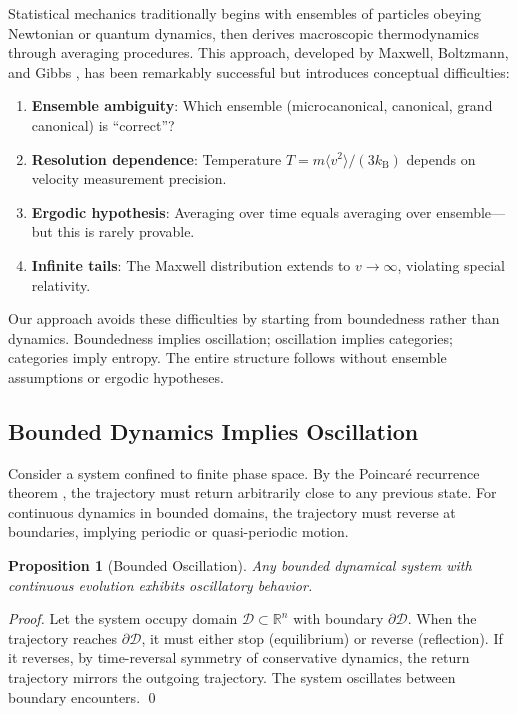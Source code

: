 \documentclass[twocolumn,10pt]{article}
\newtheorem{proposition}[theorem]{Proposition}
\theoremstyle{definition}
\theoremstyle{remark}
\newcommand{\kB}{k_{\mathrm{B}}}
\begin{document}
Statistical mechanics traditionally begins with ensembles of particles obeying Newtonian or quantum dynamics, then derives macroscopic thermodynamics through averaging procedures. This approach, developed by Maxwell, Boltzmann, and Gibbs \citep{gibbs1902elementary, boltzmann1896vorlesungen}, has been remarkably successful but introduces conceptual difficulties:

\begin{enumerate}
\item \textbf{Ensemble ambiguity}: Which ensemble (microcanonical, canonical, grand canonical) is ``correct''?
\item \textbf{Resolution dependence}: Temperature $T = m\langle v^2\rangle/(3\kB)$ depends on velocity measurement precision.
\item \textbf{Ergodic hypothesis}: Averaging over time equals averaging over ensemble---but this is rarely provable.
\item \textbf{Infinite tails}: The Maxwell distribution extends to $v \to \infty$, violating special relativity.
\end{enumerate}

Our approach avoids these difficulties by starting from boundedness rather than dynamics. Boundedness implies oscillation; oscillation implies categories; categories imply entropy. The entire structure follows without ensemble assumptions or ergodic hypotheses.

\subsection{Bounded Dynamics Implies Oscillation}

Consider a system confined to finite phase space. By the Poincar\'e recurrence theorem \citep{poincare1890}, the trajectory must return arbitrarily close to any previous state. For continuous dynamics in bounded domains, the trajectory must reverse at boundaries, implying periodic or quasi-periodic motion.

\begin{proposition}[Bounded Oscillation]
\label{prop:bounded}
Any bounded dynamical system with continuous evolution exhibits oscillatory behavior.
\end{proposition}

\begin{proof}
Let the system occupy domain $\mathcal{D} \subset \mathbb{R}^n$ with boundary $\partial\mathcal{D}$. When the trajectory reaches $\partial\mathcal{D}$, it must either stop (equilibrium) or reverse (reflection). If it reverses, by time-reversal symmetry of conservative dynamics, the return trajectory mirrors the outgoing trajectory. The system oscillates between boundary encounters. \qed
\end{proof}
\end{document}
